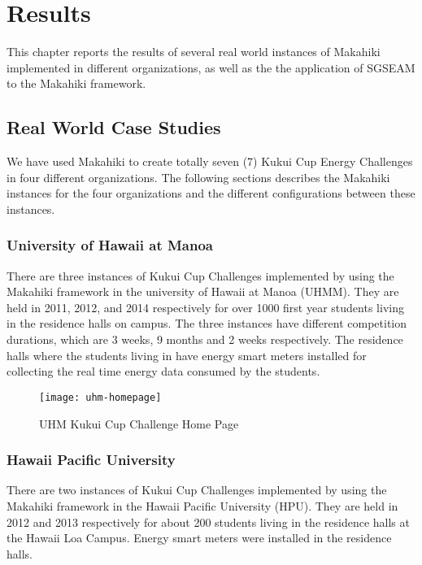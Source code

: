 \chapter{Results}
\label{cha:results}

This chapter reports the results of several real world instances of Makahiki implemented in different organizations, as well as the the application of SGSEAM to the Makahiki framework.

\section{Real World Case Studies}

We have used Makahiki to create totally seven (7) Kukui Cup Energy Challenges in four different organizations. The following sections describes the Makahiki instances for the four organizations and the different configurations between these instances.

\subsection{University of Hawaii at Manoa}

There are three instances of Kukui Cup Challenges implemented by using the Makahiki framework in the university of Hawaii at Manoa (UHMM). They are held in 2011, 2012, and 2014 respectively for over 1000 first year students living in the residence halls on campus. The three instances have different competition durations, which are 3 weeks, 9 months and 2 weeks respectively. The residence halls where the students living in have energy smart meters installed for collecting the real time energy data consumed by the students. 

\begin{figure}[ht!]
   \centering
   \texttt{[image: uhm-homepage]}
   \caption{UHM Kukui Cup Challenge Home Page}
   \label{fig:uhm-homepage}
\end{figure}


\subsection{Hawaii Pacific University}

There are two instances of Kukui Cup Challenges implemented by using the Makahiki framework in the Hawaii Pacific University (HPU). They are held in 2012 and 2013 respectively for about 200 students living in the residence halls at the Hawaii Loa Campus. Energy smart meters were installed in the residence halls.


